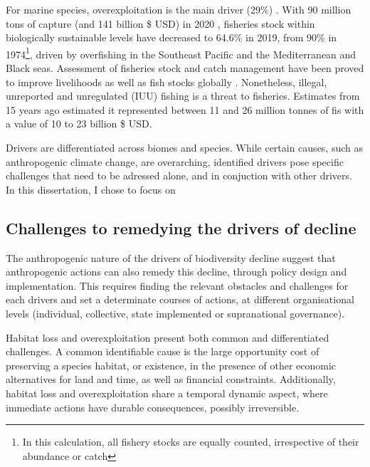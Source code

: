 For marine species, overexploitation is the main driver (29\%) \citep{ipbes_2022_6417333}. With 90 million tons of capture  (and 141 billion \$ USD)  in 2020 \citep{fao_2022_state}, fisheries stock within biologically sustainable levels have decreased to 64.6\% in 2019, from 90\% in 1974\footnote{ In this calculation, all fishery stocks are equally counted, irrespective of their abundance or catch}, driven by overfishing in the Southeast Pacific and the Mediterranean and Black seas. Assessment of fisheries stock and catch management have been proved to improve livelihoods as well as fish stocks globally \citep{melnychuk_2017_fisheries, hilborn_2020_effective}. Nonetheless, illegal, unreported and unregulated (IUU) fishing is a threat to fisheries. Estimates from 15 years ago \citep{agnew_estimating_2009} estimated it represented between 11 and 26 million tonnes of fis with a value of 10 to 23 billion \$ USD. 

Drivers are differentiated across biomes and species. While certain causes, such as anthropogenic climate change, are overarching, identified drivers pose specific challenges that need to be adressed alone, and in conjuction with other drivers. \\

In this dissertation, I chose to focus on 

\subsection*{Challenges to remedying the drivers of decline}

The anthropogenic nature of the drivers of biodiversity decline suggest that anthropogenic actions can also remedy this decline, through policy design and implementation. This requires finding the relevant obstacles and challenges for each drivers and set a determinate courses of actions, at different organisational levels (individual, collective, state implemented or supranational governance).

Habitat loss and overexploitation present both common and differentiated challenges. A common identifiable cause is the large opportunity cost of preserving a species habitat, or existence, in the presence of other economic alternatives for land and time, as well as financial constraints. Additionally, habitat loss and overexploitation share a temporal dynamic aspect, where immediate actions have durable consequences, possibly irreversible.

